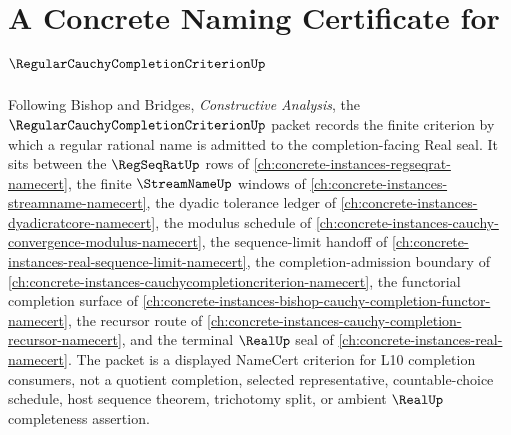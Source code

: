 \chapter{A Concrete Naming Certificate for $\RegularCauchyCompletionCriterionUp$}
\label{ch:concrete-instances-regular-cauchy-completion-criterion-namecert}

Following Bishop and Bridges, \emph{Constructive Analysis}, the $\RegularCauchyCompletionCriterionUp$ packet records the finite criterion by which a regular rational name is admitted to the completion-facing Real seal. It sits between the $\RegSeqRatUp$ rows of \autoref{ch:concrete-instances-regseqrat-namecert}, the finite $\StreamNameUp$ windows of \autoref{ch:concrete-instances-streamname-namecert}, the dyadic tolerance ledger of \autoref{ch:concrete-instances-dyadicratcore-namecert}, the modulus schedule of \autoref{ch:concrete-instances-cauchy-convergence-modulus-namecert}, the sequence-limit handoff of \autoref{ch:concrete-instances-real-sequence-limit-namecert}, the completion-admission boundary of \autoref{ch:concrete-instances-cauchycompletioncriterion-namecert}, the functorial completion surface of \autoref{ch:concrete-instances-bishop-cauchy-completion-functor-namecert}, the recursor route of \autoref{ch:concrete-instances-cauchy-completion-recursor-namecert}, and the terminal $\RealUp$ seal of \autoref{ch:concrete-instances-real-namecert}. The packet is a displayed NameCert criterion for L10 completion consumers, not a quotient completion, selected representative, countable-choice schedule, host sequence theorem, trichotomy split, or ambient $\RealUp$ completeness assertion.

